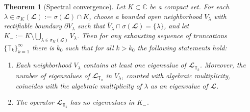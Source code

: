 \documentclass[10pt,a4paper]{amsart}
\newcommand{\LI}{{\mathbb T}}
\newtheorem{theorem}{Theorem}
\begin{document}
\setcounter{theorem}{1}
\begin{theorem}[Spectral convergence]
Let \(K \subset \mathbb C\) be a compact set. For each \(\lambda \in \sigma_K(\mathbfcal L) := \sigma(\mathbfcal L) \cap K\), choose a bounded open neighborhood \(V_\lambda\) with rectifiable boundary \(\partial V_\lambda\) such that
    $\overline V_\lambda \cap \sigma(\mathbfcal L) = \{\lambda\}$,
and let
    $K_- := K \setminus \bigcup_{\lambda \in \sigma_K(\mathbfcal L)} V_\lambda$.
    Then for any exhausting sequence of truncations $\{\LI_k\}_{k=1}^\infty$ there is $k_0$ such that for all $k > k_0$ the following statements hold:
\begin{enumerate}
    \item
        Each neighborhood \(V_\lambda\) contains at least one eigenvalue of \(\mathbfcal L_{\LI_k}\). Moreover, the number of eigenvalues of \(\mathbfcal L_{\LI_k}\) in \(V_\lambda\), counted with algebraic multiplicity, coincides with the algebraic multiplicity of \(\lambda\) as an eigenvalue of \(\mathbfcal L\).

    \item
        The operator \(\mathbfcal L_{\LI_k}\) has no eigenvalues in \(K_-\).
\end{enumerate}
\label{th:spectrum-convergence}
\end{theorem}
\end{document}

